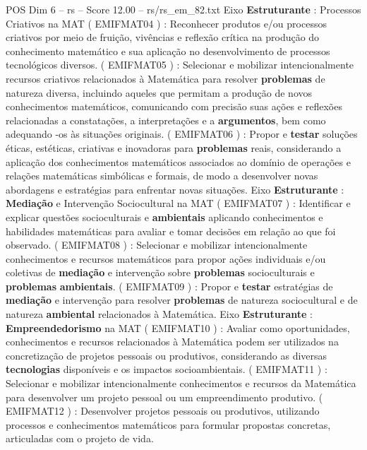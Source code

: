 \begin{textsample}{POS Dim 6 – rs – Score 12.00 – rs/rs\_em\_82.txt}
Eixo \textbf{Estruturante} : Processos Criativos na MAT ( EMIFMAT04 ) : Reconhecer produtos e/ou processos criativos por meio de fruição, vivências e reflexão crítica na produção do conhecimento matemático e sua aplicação no desenvolvimento de processos tecnológicos diversos. ( EMIFMAT05 ) : Selecionar e mobilizar intencionalmente recursos criativos relacionados à Matemática para resolver \textbf{problemas} de natureza diversa, incluindo aqueles que permitam a produção de novos conhecimentos matemáticos, comunicando com precisão suas ações e reflexões relacionadas a constatações, a interpretações e a \textbf{argumentos}, bem como adequando -os às situações originais. ( EMIFMAT06 ) : Propor e \textbf{testar} soluções éticas, estéticas, criativas e inovadoras para \textbf{problemas} reais, considerando a aplicação dos conhecimentos matemáticos associados ao domínio de operações e relações matemáticas simbólicas e formais, de modo a desenvolver novas abordagens e estratégias para enfrentar novas situações.
Eixo \textbf{Estruturante} : \textbf{Mediação} e Intervenção Sociocultural na MAT ( EMIFMAT07 ) : Identificar e explicar questões socioculturais e \textbf{ambientais} aplicando conhecimentos e habilidades matemáticas para avaliar e tomar decisões em relação ao que foi observado. ( EMIFMAT08 ) : Selecionar e mobilizar intencionalmente conhecimentos e recursos matemáticos para propor ações individuais e/ou coletivas de \textbf{mediação} e intervenção sobre \textbf{problemas} socioculturais e \textbf{problemas} \textbf{ambientais}. ( EMIFMAT09 ) : Propor e \textbf{testar} estratégias de \textbf{mediação} e intervenção para resolver \textbf{problemas} de natureza sociocultural e de natureza \textbf{ambiental} relacionados à Matemática.
Eixo \textbf{Estruturante} : \textbf{Empreendedorismo} na MAT ( EMIFMAT10 ) : Avaliar como oportunidades, conhecimentos e recursos relacionados à Matemática podem ser utilizados na concretização de projetos pessoais ou produtivos, considerando as diversas \textbf{tecnologias} disponíveis e os impactos socioambientais. ( EMIFMAT11 ) : Selecionar e mobilizar intencionalmente conhecimentos e recursos da Matemática para desenvolver um projeto pessoal ou um empreendimento produtivo. ( EMIFMAT12 ) : Desenvolver projetos pessoais ou produtivos, utilizando processos e conhecimentos matemáticos para formular propostas concretas, articuladas com o projeto de vida.

\end{textsample}
